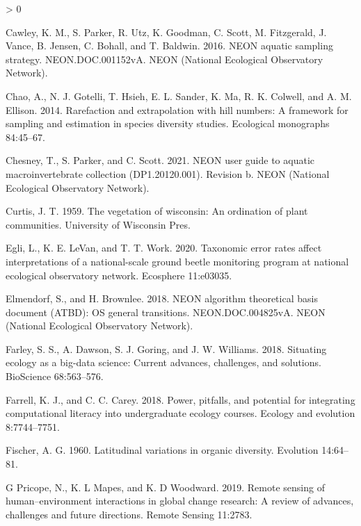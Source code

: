 \documentclass[
  12pt,
]{article}
\newlength{\cslhangindent}
\newenvironment{CSLReferences}[2] %
 {%
  \setlength{\parindent}{0pt}
  \ifodd #1 \everypar{\setlength{\hangindent}{\cslhangindent}}\ignorespaces\fi
  \ifnum #2 > 0
  \setlength{\parskip}{#2\baselineskip}
  \fi
 }%
 {}
\begin{document}
\begin{CSLReferences}{1}{0}
\leavevmode\hypertarget{ref-Cawley2016}{}%
Cawley, K. M., S. Parker, R. Utz, K. Goodman, C. Scott, M. Fitzgerald, J. Vance, B. Jensen, C. Bohall, and T. Baldwin. 2016. NEON aquatic sampling strategy. NEON.DOC.001152vA. NEON (National Ecological Observatory Network).

\leavevmode\hypertarget{ref-chao2014rarefaction}{}%
Chao, A., N. J. Gotelli, T. Hsieh, E. L. Sander, K. Ma, R. K. Colwell, and A. M. Ellison. 2014. Rarefaction and extrapolation with hill numbers: A framework for sampling and estimation in species diversity studies. Ecological monographs 84:45--67.

\leavevmode\hypertarget{ref-Chesney2021}{}%
Chesney, T., S. Parker, and C. Scott. 2021. NEON user guide to aquatic macroinvertebrate collection (DP1.20120.001). Revision b. NEON (National Ecological Observatory Network).

\leavevmode\hypertarget{ref-curtis1959vegetation}{}%
Curtis, J. T. 1959. The vegetation of wisconsin: An ordination of plant communities. University of Wisconsin Pres.

\leavevmode\hypertarget{ref-egli2020taxonomic}{}%
Egli, L., K. E. LeVan, and T. T. Work. 2020. Taxonomic error rates affect interpretations of a national-scale ground beetle monitoring program at national ecological observatory network. Ecosphere 11:e03035.

\leavevmode\hypertarget{ref-Elmendorf2018}{}%
Elmendorf, S., and H. Brownlee. 2018. NEON algorithm theoretical basis document (ATBD): OS general transitions. NEON.DOC.004825vA. NEON (National Ecological Observatory Network).

\leavevmode\hypertarget{ref-farley2018situating}{}%
Farley, S. S., A. Dawson, S. J. Goring, and J. W. Williams. 2018. Situating ecology as a big-data science: Current advances, challenges, and solutions. BioScience 68:563--576.

\leavevmode\hypertarget{ref-farrell2018power}{}%
Farrell, K. J., and C. C. Carey. 2018. Power, pitfalls, and potential for integrating computational literacy into undergraduate ecology courses. Ecology and evolution 8:7744--7751.

\leavevmode\hypertarget{ref-fischer1960latitudinal}{}%
Fischer, A. G. 1960. Latitudinal variations in organic diversity. Evolution 14:64--81.

\leavevmode\hypertarget{ref-g2019remote}{}%
G Pricope, N., K. L Mapes, and K. D Woodward. 2019. Remote sensing of human--environment interactions in global change research: A review of advances, challenges and future directions. Remote Sensing 11:2783.


\end{CSLReferences}
\end{document}
